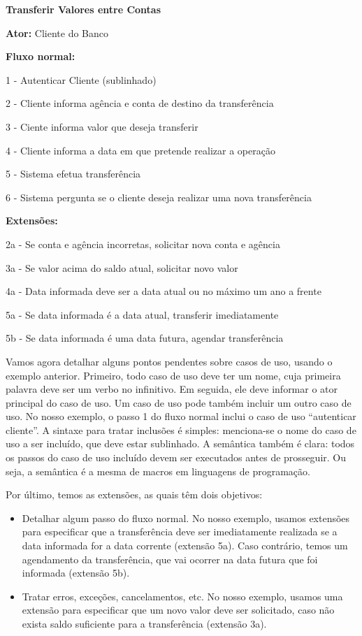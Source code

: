 \documentclass[
  11pt,
  twoside]{book}
\renewenvironment{quote}{\centering \vspace{1.5ex} \begin{tcolorbox}[colback=backcolor, width=4.9in]}{\end{tcolorbox}}
\begin{document}
\begin{quote}
\textbf{Transferir Valores entre Contas}

\textbf{Ator:} Cliente do Banco

\textbf{Fluxo normal:}

1 - Autenticar Cliente (sublinhado)

2 - Cliente informa agência e conta de destino da transferência

3 - Ciente informa valor que deseja transferir

4 - Cliente informa a data em que pretende realizar a operação

5 - Sistema efetua transferência

6 - Sistema pergunta se o cliente deseja realizar uma nova transferência

\textbf{Extensões:}

2a - Se conta e agência incorretas, solicitar nova conta e agência

3a - Se valor acima do saldo atual, solicitar novo valor

4a - Data informada deve ser a data atual ou no máximo um ano a frente

5a - Se data informada é a data atual, transferir imediatamente

5b - Se data informada é uma data futura, agendar transferência
\end{quote}

Vamos agora detalhar alguns pontos pendentes sobre casos de uso, usando
o exemplo anterior. Primeiro, todo caso de uso deve ter um nome, cuja
primeira palavra deve ser um verbo no infinitivo. Em seguida, ele deve
informar o ator principal do caso de uso. Um caso de uso pode também
incluir um outro caso de uso. No nosso exemplo, o passo 1 do fluxo
normal inclui o caso de uso ``autenticar cliente''. A sintaxe para
tratar inclusões é simples: menciona-se o nome do caso de uso a ser
incluído, que deve estar sublinhado. A semântica também é clara: todos
os passos do caso de uso incluído devem ser executados antes de
prosseguir. Ou seja, a semântica é a mesma de macros em linguagens de
programação.

Por último, temos as extensões, as quais têm dois objetivos:

\begin{itemize}
\item
  Detalhar algum passo do fluxo normal. No nosso exemplo, usamos
  extensões para especificar que a transferência deve ser imediatamente
  realizada se a data informada for a data corrente (extensão 5a). Caso
  contrário, temos um agendamento da transferência, que vai ocorrer na
  data futura que foi informada (extensão 5b).
\item
  Tratar erros, exceções, cancelamentos, etc. No nosso exemplo, usamos
  uma extensão para especificar que um novo valor deve ser solicitado,
  caso não exista saldo suficiente para a transferência (extensão 3a).
\end{itemize}
\end{document}
